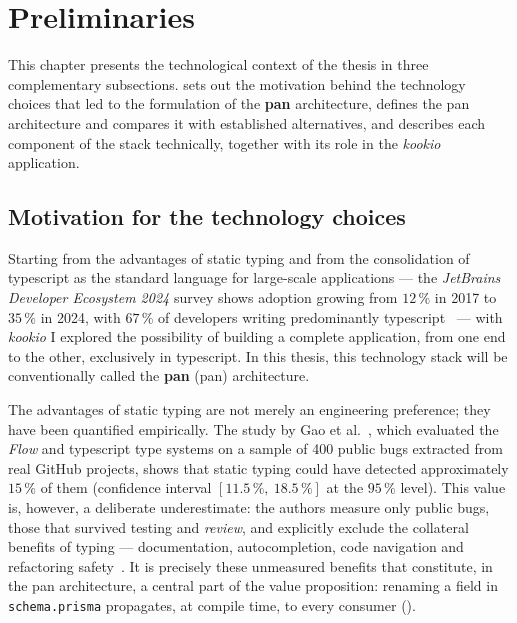 \section{Preliminaries}\label{cap:preliminarii}

This chapter presents the technological context of the thesis in three complementary subsections.
 sets out the motivation behind the technology choices that led to the formulation of the \textbf{\gls{pan}} architecture,  defines the \gls{pan} architecture and compares it with established alternatives, and  describes each component of the stack technically, together with its role in the \textit{\gls{kookio}} application.

\subsection{Motivation for the technology choices}\label{sec:motivatia}

Starting from the advantages of static typing and from the consolidation of \gls{typescript} as the standard language for large-scale applications --- the \textit{JetBrains Developer Ecosystem 2024} survey shows adoption growing from \(12\,\%\) in 2017 to \(35\,\%\) in 2024, with \(67\,\%\) of developers writing predominantly \gls{typescript}~\cite{jetbrainsJsSurvey2024} --- with \textit{\gls{kookio}} I explored the possibility of building a complete application, from one end to the other, exclusively in \gls{typescript}.
In this thesis, this technology stack will be conventionally called the \textbf{\gls{pan}} (\acrlong{pan}) architecture.

The advantages of static typing are not merely an engineering preference; they have been quantified empirically. The study by Gao et al.~\cite{gao2017type}, which evaluated the \textit{Flow} and \gls{typescript} type systems on a sample of 400 public bugs extracted from real GitHub projects, shows that static typing could have detected approximately \(15\,\%\) of them (confidence interval \([11.5\,\%,\ 18.5\,\%]\) at the \(95\,\%\) level). This value is, however, a deliberate underestimate: the authors measure only public bugs, those that survived testing and \textit{review}, and explicitly exclude the collateral benefits of typing --- documentation, autocompletion, code navigation and refactoring safety~\cite{gao2017type}. It is precisely these unmeasured benefits that constitute, in the \gls{pan} architecture, a central part of the value proposition: renaming a field in \texttt{schema.prisma} propagates, at compile time, to every consumer ().

